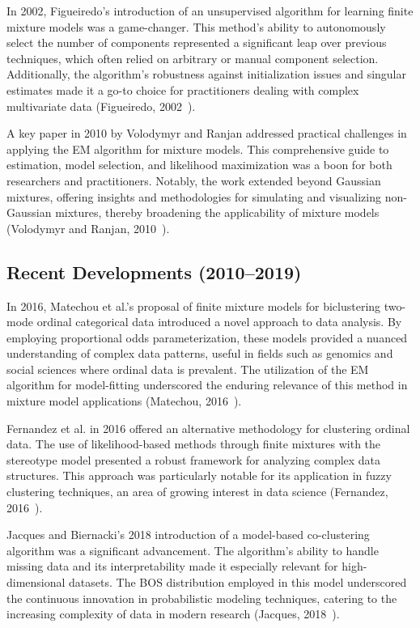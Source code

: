 \documentclass{article}
\begin{document}
In 2002, Figueiredo's introduction of an unsupervised algorithm for learning finite mixture models was a game-changer. This method's ability to autonomously select the number of components represented a significant leap over previous techniques, which often relied on arbitrary or manual component selection. Additionally, the algorithm's robustness against initialization issues and singular estimates made it a go-to choice for practitioners dealing with complex multivariate data (Figueiredo, 2002~\cite{figueiredo2002unsupervised}).

A key paper in 2010 by Volodymyr and Ranjan addressed practical challenges in applying the EM algorithm for mixture models. This comprehensive guide to estimation, model selection, and likelihood maximization was a boon for both researchers and practitioners. Notably, the work extended beyond Gaussian mixtures, offering insights and methodologies for simulating and visualizing non-Gaussian mixtures, thereby broadening the applicability of mixture models (Volodymyr and Ranjan, 2010~\cite{10.1214/09-SS053}).

\subsection*{Recent Developments (2010--2019)}

In 2016, Matechou et al.'s proposal of finite mixture models for biclustering two-mode ordinal categorical data introduced a novel approach to data analysis. By employing proportional odds parameterization, these models provided a nuanced understanding of complex data patterns, useful in fields such as genomics and social sciences where ordinal data is prevalent. The utilization of the EM algorithm for model-fitting underscored the enduring relevance of this method in mixture model applications (Matechou, 2016~\cite{matechou2016biclustering}).

Fernandez et al. in 2016 offered an alternative methodology for clustering ordinal data. The use of likelihood-based methods through finite mixtures with the stereotype model presented a robust framework for analyzing complex data structures. This approach was particularly notable for its application in fuzzy clustering techniques, an area of growing interest in data science (Fernandez, 2016~\cite{fernandez2016mixture}).

Jacques and Biernacki's 2018 introduction of a model-based co-clustering algorithm was a significant advancement. The algorithm's ability to handle missing data and its interpretability made it especially relevant for high-dimensional datasets. The BOS distribution employed in this model underscored the continuous innovation in probabilistic modeling techniques, catering to the increasing complexity of data in modern research (Jacques, 2018~\cite{jacques2018model}).
\end{document}
